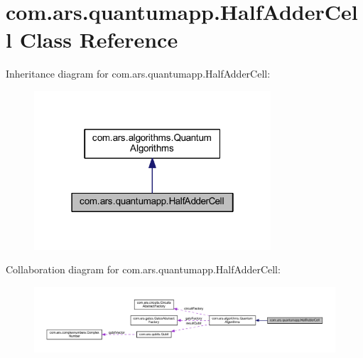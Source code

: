 \hypertarget{classcom_1_1ars_1_1quantumapp_1_1_half_adder_cell}{}\section{com.\+ars.\+quantumapp.\+Half\+Adder\+Cell Class Reference}
\label{classcom_1_1ars_1_1quantumapp_1_1_half_adder_cell}


Inheritance diagram for com.\+ars.\+quantumapp.\+Half\+Adder\+Cell\+:\nopagebreak
\begin{figure}[H]
\begin{center}
\leavevmode
\includegraphics[width=250pt]{classcom_1_1ars_1_1quantumapp_1_1_half_adder_cell__inherit__graph}
\end{center}
\end{figure}


Collaboration diagram for com.\+ars.\+quantumapp.\+Half\+Adder\+Cell\+:
\nopagebreak
\begin{figure}[H]
\begin{center}
\leavevmode
\includegraphics[width=350pt]{classcom_1_1ars_1_1quantumapp_1_1_half_adder_cell__coll__graph}
\end{center}
\end{figure}
